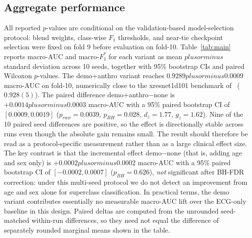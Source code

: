 \documentclass[mathematics,article,submit,pdftex]{Definitions/mdpi}
\def\texttt#1{#1}%
\def\mathrm#1{#1}%
\def\pm{plus or minus }%
\begin{document}
\subsection{Aggregate performance}
All reported $p$-values are conditional on the validation-based model-selection protocol: blend weights, class-wise $F_1$ thresholds, and near-tie checkpoint selection were fixed on fold 9 before evaluation on fold-10.
Table~\ref{tab:main} reports macro-AUC and macro-$F_1^{\ast}$ for each variant as mean $\pm$ standard deviation across 10 seeds, together with 95\% bootstrap CIs and paired Wilcoxon $p$-values. The \texttt{demo+anthro} variant reaches $0.9289 \pm 0.0009$ macro-AUC on fold-10, numerically close to the xresnet1d101 benchmark of~\cite{Strodthoff2021} ($0.928(5)$). The paired difference \texttt{demo+anthro}${-}$\texttt{none} is $+0.0014 \pm 0.0003$ macro-AUC with a 95\% paired bootstrap CI of $[0.0009, 0.0019]$ ($p_{\mathrm{raw}}{=}0.0039$, $p_{\mathrm{BH}}{=}0.028$, $d_{\mathrm{z}}{=}1.77$, $g_{\mathrm{z}}{=}1.62$). Nine of the 10 paired seed differences are positive, so the effect is directionally stable across runs even though the absolute gain remains small. The result should therefore be read as a protocol-specific measurement rather than as a large clinical effect size. The key contrast is that the incremental effect \texttt{demo}${-}$\texttt{none} (that is, adding age and sex only) is $+0.0002 \pm 0.0002$ macro-AUC with a 95\% paired bootstrap CI of $[-0.0002, 0.0007]$ ($p_{\mathrm{BH}}{=}0.626$), \emph{not} significant after BH-FDR correction: under this multi-seed protocol we do not detect an improvement from age and sex alone for superclass classification. In practical terms, the \texttt{demo} variant contributes essentially no measurable macro-AUC lift over the ECG-only baseline in this design. Paired deltas are computed from the unrounded seed-matched within-run differences, so they need not equal the difference of separately rounded marginal means shown in the table.
\end{document}
